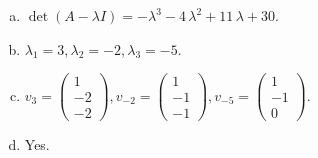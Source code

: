 \begin{questions}
\begin{solution}
\begin{enumerate}[(a)]
\item $\det(A-\lambda I)=-{\lambda}^{3} - 4 \, {\lambda}^{2} + 11 \, {\lambda} + 30$.
\item ${\lambda}_1=3, {\lambda}_2=-2, {\lambda}_3=-5$.
\item $v_{3}=\left(\begin{array}{r}
1 \\
-2 \\
-2
\end{array}\right), v_{-2}=\left(\begin{array}{r}
1 \\
-1 \\
-1
\end{array}\right), v_{-5}=\left(\begin{array}{r}
1 \\
-1 \\
0
\end{array}\right)$.
\item Yes.
\end{enumerate}
\end{solution}

\end{questions}

\newpage


\begin{center}
\end{center}

